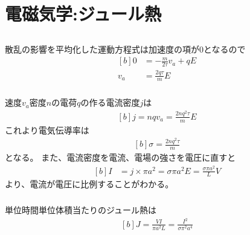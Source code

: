 \documentclass[../ap_2012.tex]{subfiles}
\begin{document}
\setcounter{chapter}{1}
\chapter{電磁気学:ジュール熱}
\section{}
\subsection{}
散乱の影響を平均化した運動方程式は加速度の項が0となるので
\begin{equation}\begin{aligned}[b]
    0 &= -\frac{m}{2\tau}v_a+qE\\
    v_a &= \frac{2q\tau}{m}E
\end{aligned}\end{equation}

\subsection{}
速度\(v_a\)密度\(n\)の電荷\(q\)の作る電流密度\(j\)は
\begin{equation}\begin{aligned}[b]
    j = nqv_a = \frac{2nq^2\tau}{m}E
\end{aligned}\end{equation}
これより電気伝導率は
\begin{equation}\begin{aligned}[b]
    \sigma = \frac{2nq^2\tau}{m}
\end{aligned}\end{equation}
となる。
また、電流密度を電流、電場の強さを電圧に直すと
\begin{equation}\begin{aligned}[b]
    I &= j \times \pi a^2 = \sigma \pi a^2 E =\frac{\sigma \pi a^2}{L} V
\end{aligned}\end{equation}
より、電流が電圧に比例することがわかる。

\subsection{}
単位時間単位体積当たりのジュール熱は
\begin{equation}\begin{aligned}[b]
    J=\frac{VI}{\pi a^2L} = \frac{I^2}{\sigma \pi^2a^4}
\end{aligned}\end{equation}
\end{document}
